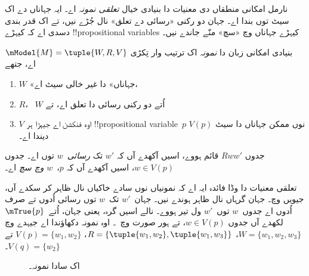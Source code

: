 \documentclass[../../../include/open-logic-section]{subfiles}
\begin{document}


نارمل امکانی منطقاں دی معنیات دا بنیادی خیال \emph{تعلقی نمونہ}
اے۔ ایہ جہاناں دے اک سیٹ توں بندا اے۔ جہان دو رکنی «رسائی دے
تعلق» نال جُڑے نیں، تے اک قدر بندی دسدی اے کہ کیہڑے
!!{propositional variable}s کیہڑے جہاناں وچ «سچ» منّے جاندے نیں۔

\begin{defn}
  بنیادی امکانی زبان دا \emph{نمونہ} اک ترتیب وار تِکڑی
  $\mModel{M}
  = \tuple{W, R, V}$ اے، جتھے
  \begin{enumerate}
  \item $W$ «جہاناں» دا غیر خالی سیٹ اے،
  \item $R$، ~$W$ اُتے دو رکنی رسائی دا تعلق اے، تے
  \item $V$ اوہ فنکشن اے جیہڑا ہر !!{propositional
    variable}~$p$ نوں ممکن جہاناں دا سیٹ $V(p)$ دیندا اے۔
  \end{enumerate}
  جدوں $Rww'$ قائم ہووے، اسیں آکھدے آں کہ $w'$ تک
  \emph{رسائی}~$w$ توں اے۔ جدوں $w \in V(p)$، اسیں آکھدے آں
  کہ $p$،~$w$ \emph{وچ سچ} اے۔
\end{defn}

تعلقی معنیات دا وڈا فائدہ ایہ اے کہ نمونیاں نوں سادے خاکیاں
نال ظاہر کر سکدے آں، جیویں  وچ۔ جہان گرہاں
نال ظاہر ہوندے نیں۔ جہان~$w'$ تک~$w$ توں رسائی اُدوں تے صرف
اُدوں اے جدوں~$w$ توں~$w'$ ول تیر ہووے۔ نالے اسیں گرہ،
یعنی جہان، اُتے~$\mTrue{p}$ لکھدے آں جدوں $w \in V(p)$،
تے ہور صورت وچ~۔  اوہ نمونہ
دکھاؤندا اے جیہدے وچ $W = \{w_1, w_2, w_3\}$،
$R = \{\tuple{w_1, w_2},\tuple{w_1,
  w_3}\}$، $V(p) = \{w_1, w_2\}$ تے $V(q) = \{w_2\}$۔

\begin{figure}
  \begin{center}
  \end{center}
  \caption{اک سادا نمونہ۔}
\end{figure}
\end{document}
